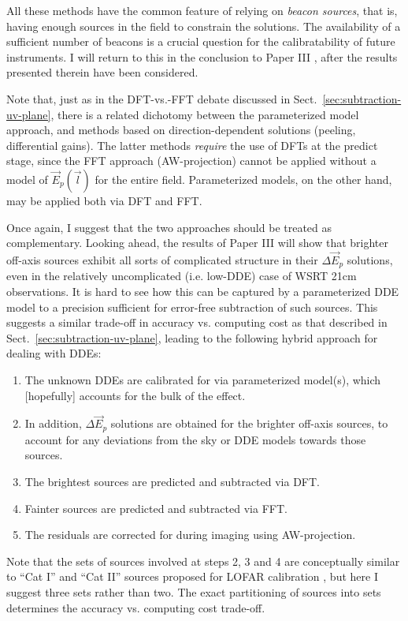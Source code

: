 \documentclass{aa}
\newcommand{\jones}[2]{\vec {#1}_{#2}}
\begin{document}
All these methods have the common feature of relying on \emph{beacon sources}, that is, having enough sources in the field to constrain the solutions. The availability of a sufficient number of beacons is a crucial question for the calibratability of future instruments. I will return to this in the conclusion to Paper III \citep{RRIME3}, after the results presented therein have been considered.

Note that, just as in the DFT-vs.-FFT debate discussed in Sect.~\ref{sec:subtraction-uv-plane}, there is a related dichotomy between the parameterized model approach, and methods based on direction-dependent solutions (peeling, differential gains). The latter methods {\em require} the use of DFTs at the predict stage, since the FFT approach (AW-projection) cannot be applied without a model of $\jones{E}{p}(\vec l)$ for the entire field. Parameterized models, on the other hand, may be applied both via DFT and FFT. 

Once again, I suggest that the two approaches should be treated as complementary. Looking ahead, the results of Paper III \citep{RRIME3} will show that brighter off-axis sources exhibit all sorts of complicated structure in their $\Delta\jones{E}{p}$ solutions, even in the relatively uncomplicated (i.e. low-DDE) case of WSRT 21cm observations. It is hard to see how this can be captured by a parameterized DDE model to a precision sufficient for error-free subtraction of such sources. This suggests a similar trade-off in accuracy vs. computing cost as that described in Sect.~\ref{sec:subtraction-uv-plane}, leading to the following hybrid approach for dealing with DDEs:

\begin{enumerate}
\item The unknown DDEs are calibrated for via parameterized model(s), which [hopefully] accounts for the bulk of the effect.
\item In addition, $\Delta\jones{E}{p}$ solutions are obtained for the brighter off-axis sources, to account for any deviations from the sky or DDE models towards those sources.
\item The brightest sources are predicted and subtracted via DFT. 
\item Fainter sources are predicted and subtracted via FFT.
\item The residuals are corrected for during imaging using AW-projection.
\end{enumerate}

Note that the sets of sources involved at steps 2, 3 and 4 are conceptually similar to ``Cat I'' and ``Cat II'' sources proposed for LOFAR calibration \citep{JEN:LOFAR3}, but here I suggest three sets rather than two. The exact partitioning of sources into sets determines the accuracy vs. computing cost trade-off.
\end{document}
